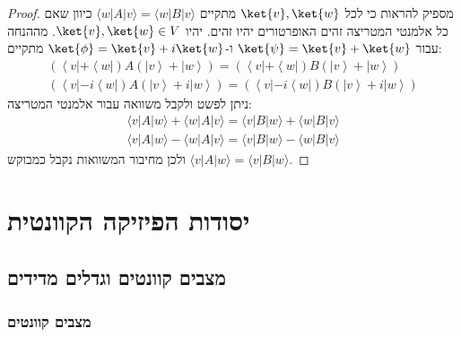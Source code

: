 \documentclass{tstextbook}
\begin{document}
\begin{proof}
מספיק להראות כי לכל \(\ket{v},\ket{w}\) מתקיים \(\langle w|A|v \rangle=\langle w|B|v \rangle\) כיוון שאם כל אלמנטי המטריצה זהים האופרטורים יהיו זהים.
יהיו \(\ket{v},\ket{w}\in V\). מההנחה עבור \(\ket{\psi}=\ket{v}+\ket{w}\) ו-\(\ket{\phi}=\ket{v}+i\ket{w}\) מתקיים:
$$\begin{gather}\left(\left\langle  v|+\left\langle  w|\right)A\left(|v \right\rangle+|w \right\rangle\right)=\left(\left\langle  v|+\left\langle  w|\right)B\left(|v \right\rangle+|w \right\rangle\right)\\\left(\left\langle  v|-i\left\langle  w|\right)A\left(|v \right\rangle+i|w \right\rangle\right)=\left(\left\langle  v|-i\left\langle  w|\right)B\left(|v \right\rangle+i|w \right\rangle\right) 
\end{gather}$$
ניתן לפשט ולקבל משוואה עבור אלמנטי המטריצה:
$$\begin{gather}\langle v|A|w\rangle+\langle w|A|v\rangle=\langle v|B|w\rangle+\langle w|B|v\rangle \\\langle v|A|w\rangle-\langle w|A|v\rangle=\langle v|B|w\rangle-\langle w|B|v\rangle
\end{gather}$$
ולכן מחיבור המשוואות נקבל כמבוקש \(\langle v|A|w \rangle=\langle v|B|w \rangle\).

\end{proof}
\section{יסודות הפיזיקה הקוונטית}

\subsection{מצבים קוונטים וגדלים מדידים}

\subsubsection{מצבים קוונטים}
\end{document}
